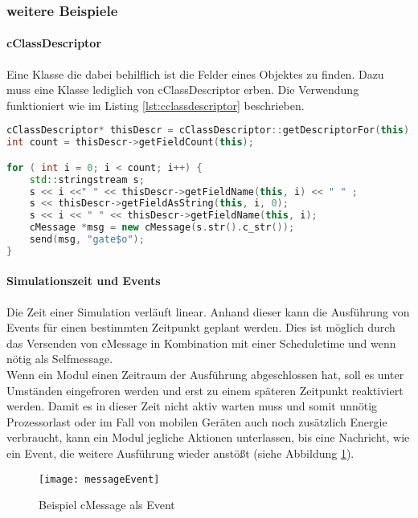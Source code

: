 \subsubsection{weitere Beispiele}

\paragraph{cClassDescriptor} Eine Klasse die dabei behilflich ist die Felder eines Objektes zu finden. Dazu muss eine Klasse lediglich von cClassDescriptor erben. Die Verwendung funktioniert wie im Listing \ref{lst:cclassdescriptor} beschrieben.

\begin{minipage}{\textwidth}
\begin{lstlisting}[language=C++,caption={Verwendung von cClassDescriptor },label=lst:cclassdescriptor]
cClassDescriptor* thisDescr = cClassDescriptor::getDescriptorFor(this);
int count = thisDescr->getFieldCount(this);

for ( int i = 0; i < count; i++) {
    std::stringstream s;
    s << i <<" " << thisDescr->getFieldName(this, i) << " " ;
    s << thisDescr->getFieldAsString(this, i, 0);
    s << i << " " << thisDescr->getFieldName(this, i);
    cMessage *msg = new cMessage(s.str().c_str());
    send(msg, "gate$o");
}
\end{lstlisting}
\end{minipage}

\paragraph{Simulationszeit und Events}

Die Zeit einer Simulation verläuft linear. Anhand dieser kann die Ausführung von Events für einen bestimmten Zeitpunkt geplant werden. Dies ist möglich durch das Versenden von cMessage in Kombination mit einer Scheduletime und wenn nötig als Selfmessage.\\
Wenn ein Modul einen Zeitraum der Ausführung abgeschlossen hat, soll es unter Umständen eingefroren werden und erst zu einem späteren Zeitpunkt reaktiviert werden. Damit es in dieser Zeit nicht aktiv warten muss und somit unnötig Prozessorlast oder im Fall von mobilen Geräten auch noch zusätzlich Energie verbraucht, kann ein Modul jegliche Aktionen unterlassen, bis eine Nachricht, wie ein Event, die weitere Ausführung wieder anstößt (siehe Abbildung \ref{fig:messageEvent}). 

\begin{figure}[htbp]
\centering
\caption{Beispiel cMessage als Event}
\label{fig:messageEvent}
\texttt{[image: messageEvent]}
\end{figure}

